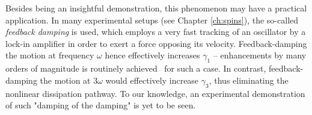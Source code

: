 Besides being an insightful demonstration, this phenomenon may have a practical application. In many experimental setups (see Chapter \ref{ch:spins}), the so-called \textit{feedback damping} is used, which employs a very fast tracking of an oscillator by a lock-in amplifier in order to exert a force opposing its velocity. Feedback-damping the motion at frequency $\omega$ hence effectively increases $\gamma_1$ -- enhancements by many orders of magnitude is routinely achieved~\cite{Courty_2001, Kleckner_2006, Poggio_2007, Rossi_2018} for such a case.
In contrast, feedback-damping the motion at $3\omega$ would effectively increase $\gamma_3$, thus eliminating the nonlinear dissipation pathway. To our knowledge, an experimental demonstration of such "damping of the damping" is yet to be seen. 
